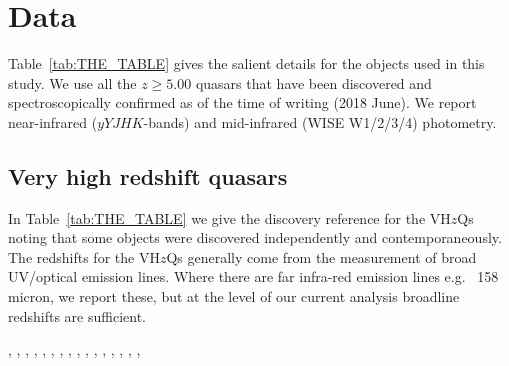 \documentclass[usenatbib]{mnras}
\begin{document}
\section{Data}



Table~\ref{tab:THE_TABLE} gives the salient details for the objects
used in this study. We use all the $z\geq5.00$ quasars that
have been discovered and spectroscopically confirmed as of the time of
writing (2018 June). We report near-infrared ($yYJHK$-bands)
and mid-infrared (WISE W1/2/3/4) photometry.

\subsection{Very high redshift quasars}
In Table~\ref{tab:THE_TABLE} we give the discovery reference for the
VH$z$Qs noting that some objects were discovered independently and
contemporaneously.  The redshifts for the VH$z$Qs generally come from
the measurement of broad UV/optical emission lines. Where 
there are far infra-red emission lines e.g. \cii~158 micron, we report 
these, but at the level of our current analysis broadline redshifts are
sufficient. 

\citet{Mortlock2011}, \citet{McGreer2013}, \citet{Venemans2013},  \citet{Venemans2013}, \citet{Venemans2015a},  \citet{Venemans2015b}, \citet{Banados2016}, \citet{Matsuoka2016}, \citet{Reed2017}, \citet{Wang2017}, \citet{Mazzucchelli2017}, \citet{Ikeda2017}, \citet{Matsuoka2017}, \citet{Tang2017}, \citet{Koptelova2017}, \citet{Matsuoka2017}, \citet{Banados2018}
\end{document}
